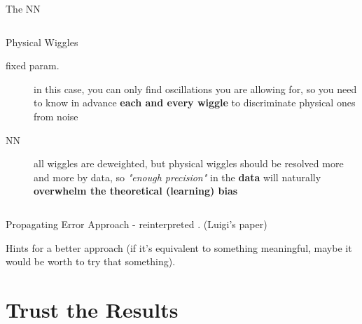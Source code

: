 \documentclass[9pt]{beamer}
\begin{document}
\begin{frame}{The NN}
\begin{columns}
\begin{column}{0.5\textwidth}
\begin{exampleblock}{Physical Wiggles}
                \begin{description}
                    \item[fixed param.] in this case, you can only find
                        oscillations you are allowing for, so you need to know
                        in advance \textbf{each and every wiggle} to
                        discriminate physical ones from noise
                    \item[NN] all wiggles are deweighted, but physical wiggles
                        should be resolved more and more by data, so
                        \textit{"enough precision"} in the
                        \alert{\textbf{data}} will naturally
                        \textbf{\alert{overwhelm} the theoretical
                        \alert{(learning) bias}}
                \end{description}
            \end{exampleblock}
        \end{column}
    \end{columns}
\end{frame}

\begin{frame}{Propagating Error}
    \nnpdf{} Approach - reinterpreted
    \let\thefootnote\relax{}. (Luigi's paper)

    Hints for a better approach (if it's equivalent to something meaningful,
    maybe it would be worth to try that something).

    
\end{frame}

\section{Trust the Results}
\end{document}
